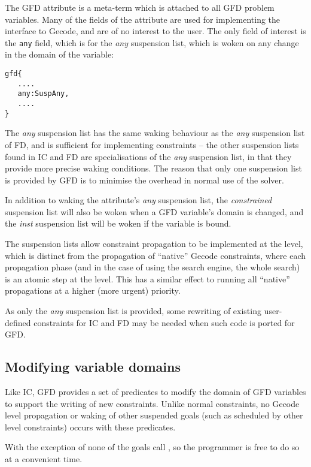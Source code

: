 The GFD attribute is a meta-term which is attached to all GFD problem variables.
Many of the fields of the attribute are used for implementing the interface to
Gecode, and are of no interest to the user. The only field of interest is the
{\tt any} field, which is for the {\it any\/} suspension list, which is woken on 
any change in the domain of the variable:

\begin{verbatim}
gfd{
   ....
   any:SuspAny,
   ....
}
\end{verbatim}

The {\it any\/} suspension list has the same waking behaviour as the 
{\it any\/} suspension
list of FD, and is sufficient for implementing constraints -- the other 
suspension lists found in IC and FD are specialisations of the {\it any\/} 
suspension list, in that they provide more precise waking conditions. 
The reason that
only one suspension list is provided by GFD is to minimise the overhead in
normal use of the solver. 


In addition to waking the attribute's {\it any\/} suspension list, the 
{\it constrained\/}
suspension list will also be woken when a GFD variable's domain is changed,
and the {\it inst\/} suspension list will be woken if the variable is bound.

The suspension lists allow constraint propagation to be implemented at the
{\eclipse} level, which is distinct from the propagation of ``native'' Gecode
constraints, where each propagation phase (and in the case of using the 
search engine, the whole search) is an atomic step at the {\eclipse} level. 
This has a similar effect to running all ``native'' propagations
at a higher (more urgent) priority.
 
As only the {\it any\/} suspension list is provided, some rewriting of existing
user-defined constraints for IC and FD may be needed when such code is ported
for GFD.

\subsection{Modifying variable domains}

Like IC, GFD provides a set of predicates to modify the domain of GFD 
variables to support the writing of new constraints. Unlike normal constraints,
no Gecode level propagation or waking of other suspended goals (such as 
scheduled by other {\eclipse} level constraints) occurs with these predicates.

With the exception of
 none of
the goals call , so
the programmer is free to do so at a convenient time.

